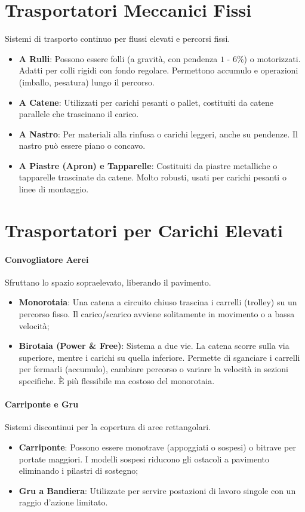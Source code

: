 %
\section{Trasportatori Meccanici Fissi}
Sistemi di trasporto continuo per flussi elevati e percorsi fissi.
\begin{itemize}
    \item \textbf{A Rulli}: Possono essere folli (a gravità, con pendenza $ 1 $ - $ 6\% $) o motorizzati. Adatti per colli rigidi con fondo regolare. Permettono accumulo e operazioni (imballo, pesatura) lungo il percorso.
    \item \textbf{A Catene}: Utilizzati per carichi pesanti o pallet, costituiti da catene parallele che trascinano il carico.
    \item \textbf{A Nastro}: Per materiali alla rinfusa o carichi leggeri, anche su pendenze. Il nastro può essere piano o concavo.
    \item \textbf{A Piastre (Apron) e Tapparelle}: Costituiti da piastre metalliche o tapparelle trascinate da catene. Molto robusti, usati per carichi pesanti o linee di montaggio.
\end{itemize}

%
\section{Trasportatori per Carichi Elevati}
%
\paragraph{Convogliatore Aerei} Sfruttano lo spazio sopraelevato, liberando il pavimento.
\begin{itemize}
    \item \textbf{Monorotaia}: Una catena a circuito chiuso trascina i carrelli (trolley) su un percorso fisso. Il carico/scarico avviene solitamente in movimento o a bassa velocità;
    \item \textbf{Birotaia (Power \& Free)}: Sistema a due vie. La catena scorre sulla via superiore, mentre i carichi su quella inferiore. Permette di sganciare i carrelli per fermarli (accumulo), cambiare percorso o variare la velocità in sezioni specifiche. È più flessibile ma costoso del monorotaia.
\end{itemize}
%
\paragraph{Carriponte e Gru} Sistemi discontinui per la copertura di aree rettangolari.
\begin{itemize}
    \item \textbf{Carriponte}: Possono essere monotrave (appoggiati o sospesi) o bitrave per portate maggiori. I modelli sospesi riducono gli ostacoli a pavimento eliminando i pilastri di sostegno;
    \item \textbf{Gru a Bandiera}: Utilizzate per servire postazioni di lavoro singole con un raggio d'azione limitato.
\end{itemize}


